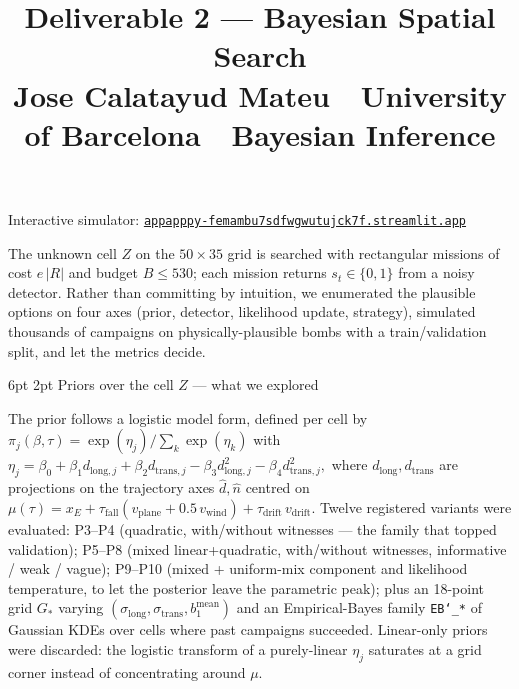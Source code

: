 \documentclass[11pt,a4paper]{article}
\title{\vspace{-1.6cm}\textbf{Deliverable 2 --- Bayesian Spatial Search}\\
       \normalsize Jose Calatayud Mateu \,\textbullet\, University of Barcelona \,\textbullet\, Bayesian Inference}
\author{}
\date{}
\makeatletter
\renewcommand\section{\@startsection{section}{1}{\z@}%
                                    {6pt \@plus 1pt \@minus 1pt}%
                                    {2pt}%
                                    {\normalfont\normalsize\bfseries}}
\makeatother
\begin{document}
\maketitle
\vspace{-1.5cm}

\begin{center}\small
Interactive simulator:
\href{https://appapppy-femambu7sdfwgwutujck7f.streamlit.app}%
     {\texttt{appapppy-femambu7sdfwgwutujck7f.streamlit.app}}
\end{center}
\vspace{-4pt}

The unknown cell $Z$ on the $50\times 35$ grid is searched with rectangular
missions of cost $e\,|R|$ and budget $B \le 530$; each mission returns
$s_t \in \{0,1\}$ from a noisy detector. Rather than committing by intuition,
we enumerated the plausible options on four axes (prior, detector, likelihood
update, strategy), simulated thousands of campaigns on physically-plausible
bombs with a train/validation split, and let the metrics decide.

\section{Priors over the cell $Z$ --- what we explored}

The prior follows a logistic model form, defined per cell by
$\pi_j(\beta, \tau) = \exp(\eta_j) / \sum_k \exp(\eta_k)$ with
\(
  \eta_j = \beta_0 + \beta_1 d_{\mathrm{long},j} + \beta_2 d_{\mathrm{trans},j}
        - \beta_3 d_{\mathrm{long},j}^{2} - \beta_4 d_{\mathrm{trans},j}^{2},
\)
where $d_{\mathrm{long}}, d_{\mathrm{trans}}$ are projections on the trajectory
axes $\hat{d}, \hat{n}$ centred on $\mu(\tau) = x_E + \tau_{\mathrm{fall}}
(v_{\mathrm{plane}} + 0.5\,v_{\mathrm{wind}}) + \tau_{\mathrm{drift}}\,v_{\mathrm{drift}}$.
Twelve registered variants were evaluated: P3--P4 (quadratic,
with/without witnesses --- the family that topped validation);
P5--P8 (mixed linear+quadratic, with/without witnesses, informative /
weak / vague); P9--P10 (mixed + uniform-mix component and likelihood
temperature, to let the posterior leave the parametric peak); plus an
18-point grid $G_{*}$ varying $(\sigma_{\mathrm{long}},
\sigma_{\mathrm{trans}}, b_1^{\mathrm{mean}})$ and an Empirical-Bayes
family \texttt{EB\char`_*} of Gaussian KDEs over cells where past campaigns
succeeded. Linear-only priors were discarded: the logistic transform of a
purely-linear $\eta_j$ saturates at a grid corner instead of concentrating
around $\mu$.
\end{document}
